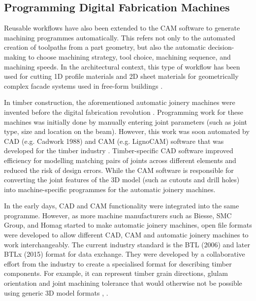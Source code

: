 \subsection{Programming Digital Fabrication Machines}
\label{subsection:introduction-programming-digital-fabrication-machines}

Reusable workflows have also been extended to the CAM software to generate machining programmes automatically. This refers not only to the automated creation of toolpaths from a part geometry, but also the automatic decision-making to choose machining strategy, tool choice, machining sequence, and machining speeds. In the architectural context, this type of workflow has been used for cutting 1D profile materials and 2D sheet materials for geometrically complex facade systems used in free-form buildings \parencite{eigensatzPanelingArchitecturalFreeform2010, sheldenDigitalSurfaceRepresentation2002}.

In timber construction, the aforementioned automatic joinery machines were invented before the digital fabrication revolution \parencite{hanshundeggeragCorporateDevelopment2023}. Programming work for these machines was initially done by manually entering joint parameters (such as joint type, size and location on the beam). However, this work was soon automated by CAD (e.g. Cadwork 1988) and CAM (e.g. LignoCAM) software that was developed for the timber industry \parencite{schwinnManufacturingPerspectives2016}. Timber-specific CAD software improved efficiency for modelling matching pairs of joints across different elements and reduced the risk of design errors. While the CAM software is responsible for converting the joint features of the 3D model (such as cutouts and drill holes) into machine-specific programmes for the automatic joinery machines.

In the early days, CAD and CAM functionality were integrated into the same programme. However, as more machine manufacturers such as Biesse, SMC Group, and Homag started to make automatic joinery machines, open file formats\textbf{ }were developed to allow different CAD, CAM and automatic joinery machines to work interchangeably. The current industry standard is the BTL (2006) and later BTLx (2015) format for data exchange. They were developed by a collaborative effort from the industry to create a specialised format for describing timber components. For example, it can represent timber grain directions, glulam orientation and joint machining tolerance that would otherwise not be possible using generic 3D model formats \parencite{lignocamBTLxWhatIt2020, design2machineHistoryDataTransfer2023}, . 


